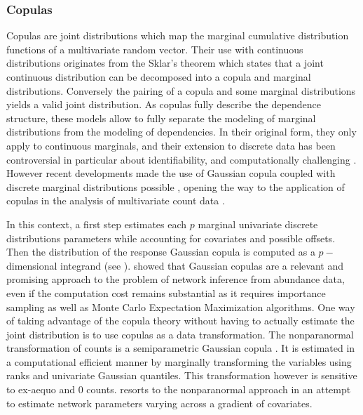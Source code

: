 
\subsubsection{Copulas}
  
Copulas are  joint  distributions which map the marginal  cumulative distribution functions of a multivariate random vector. Their use with continuous distributions originates from the Sklar's theorem which states that a joint continuous distribution can be decomposed into a copula and marginal distributions. Conversely the pairing of a copula and some marginal distributions yields a valid joint distribution. As copulas fully describe the dependence structure, these models allow to fully separate the modeling of marginal distributions from the modeling of dependencies. In their original form, they only apply to continuous marginals, and their extension to discrete data has been controversial in particular about identifiability, and computationally challenging \citep{F17}. However recent developments made the use of  Gaussian copula coupled with discrete marginal distributions possible \citep{PCJ12,PHW18}, opening the way to the application of copulas in the analysis of multivariate count data \citep{AVP19}. 

In this context, a first step estimates each $p$ marginal univariate discrete distributions parameters while accounting for covariates and possible offsets. Then the distribution of the response Gaussian copula is computed as a $p-$dimensional integrand (see \citet{PHW18}). \citet{PWT19} showed that  Gaussian copulas are a relevant and promising approach to the problem of network inference from abundance data, even if the computation cost remains substantial as it requires importance sampling as well as Monte Carlo Expectation Maximization algorithms. One way of taking advantage of the copula theory without having to actually estimate the joint distribution is to use copulas as a data transformation. The nonparanormal transformation of counts is a semiparametric Gaussian copula \citep{LLW09}. It is estimated in a computational efficient manner by marginally transforming the variables using ranks and univariate Gaussian quantiles. This transformation however is sensitive to ex-aequo and 0 counts. \cite{CWL18} resorts to the nonparanormal approach in an attempt to estimate network parameters varying across a gradient of covariates. 

